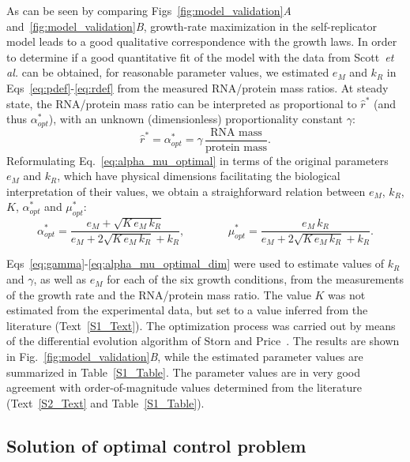 \documentclass[10pt,letterpaper]{article}
\begin{document}
{As can be seen by comparing Figs~\ref{fig:model_validation}\textit{A} and~\ref{fig:model_validation}\textit{B}, growth-rate maximization in the self-replicator model leads to a good qualitative correspondence with the growth laws.
In order to determine if a good quantitative fit of the model with the data from Scott~\textit{et al.} \cite{scott_interdependence_2010} can be obtained, for reasonable parameter values, we estimated $e_M$ and $k_R$ in Eqs~\ref{eq:pdef}-\ref{eq:rdef} from the measured RNA/protein mass ratios.
At steady state, the RNA/protein mass ratio can be interpreted as proportional to $\hat{r}^*$ (and thus $\alpha_{opt}^*$), with an unknown (dimensionless) proportionality constant $\gamma$:
\begin{equation}
\hat{r}^* = \alpha_{opt}^* = \gamma \, \frac{\text{RNA mass}}{\text{protein mass}}.
\label{eq:gamma}
\end{equation}
Reformulating Eq.~\ref{eq:alpha_mu_optimal} in terms of the original parameters $e_M$ and $k_R$, which have physical dimensions facilitating the biological interpretation of their values, we obtain a straighforward relation between $e_M$, $k_R$, $K$, $\alpha_{opt}^*$ and $\mu_{opt}^*$:
\begin{equation}
\label{eq:alpha_mu_optimal_dim}
\alpha_{opt}^* = \frac{e_M + \sqrt{K\, e_M\, k_R}}{e_M + 2\sqrt{K\, e_M\, k_R} + k_R}
, \;\;\;\;\;\;\;\;\;\;\;\;\;\; 
\mu^*_{opt} = \frac{e_M \, k_R}{e_M + 2\sqrt{K\, e_M\, k_R} + k_R}.
\end{equation}

Eqs~\ref{eq:gamma}-\ref{eq:alpha_mu_optimal_dim} were used to estimate values of $k_R$ and $\gamma$, as well as $e_M$ for each of the six growth conditions, from the measurements of the growth rate and the RNA/protein mass ratio. 
The value $K$ was not estimated from the experimental data, but set to a value inferred from the literature (Text~\ref{S1_Text}).
The optimization process was carried out by means of the differential evolution algorithm of Storn and Price~\cite{storn_differential_1997}.
The results are shown in Fig.~\ref{fig:model_validation}\textit{B}, while the estimated parameter values are summarized in Table~\ref{S1_Table}.
The parameter values are in very good agreement with order-of-magnitude values determined from the literature (Text~\ref{S2_Text} and Table~\ref{S1_Table}). 

\subsection*{Solution of optimal control problem}

}
\end{document}
